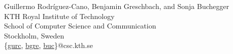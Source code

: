 \begin{center}
Guillermo Rodr\'{i}guez-Cano, Benjamin Greschbach, and Sonja Buchegger\\[2em]

KTH Royal Institute of Technology\\
School of Computer Science and Communication\\
Stockholm, Sweden\\
\{\href{gurc@csc.kth.se}{gurc}, \href{bgre@csc.kth.se}{bgre}, \href{buc@csc.kth.se}{buc}\}@csc.kth.se
\end{center}





